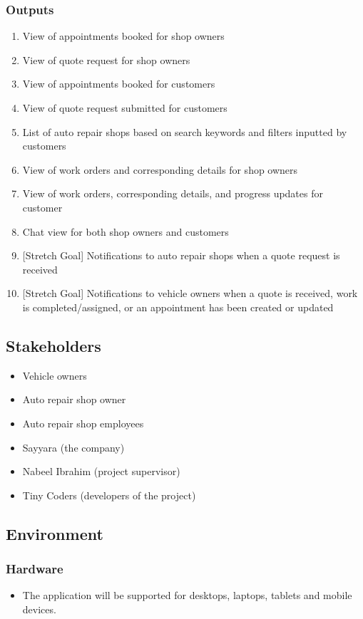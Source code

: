 \documentclass{article}
\begin{document}
\subsubsection{Outputs}
\begin{enumerate}
    \item View of appointments booked for shop owners
    \item View of quote request for shop owners
    \item View of appointments booked for customers
    \item View of quote request submitted for customers
    \item List of auto repair shops based on search keywords and filters inputted by customers
    \item View of work orders and corresponding details for shop owners
    \item View of work orders, corresponding details, and progress updates for customer
    \item Chat view for both shop owners and customers
    \item {[Stretch Goal]} Notifications to auto repair shops when a quote request is received
    \item {[Stretch Goal]} Notifications to vehicle owners when a quote is received, work is completed/assigned, 
    or an appointment has been created or updated
\end{enumerate}

\subsection{Stakeholders}
\begin{itemize}
    \item Vehicle owners
    \item Auto repair shop owner
    \item Auto repair shop employees
    \item Sayyara (the company)
    \item Nabeel Ibrahim (project supervisor)
    \item Tiny Coders (developers of the project)
\end{itemize}

\subsection{Environment}
\subsubsection{Hardware}
\begin{itemize}
    \item The application will be supported for desktops, laptops, tablets and mobile devices.
\end{itemize}
\end{document}
